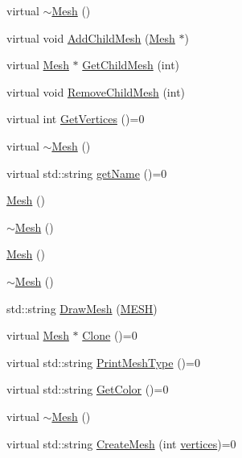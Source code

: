 \begin{DoxyCompactItemize}
virtual \mbox{\hyperlink{class_mesh_ad6a041191ed55c693254e945ce2869ff}{$\sim$\+Mesh}} ()
\item 
virtual void \mbox{\hyperlink{class_mesh_a3f1bcf55b3058829dc7f3dcf260cd231}{Add\+Child\+Mesh}} (\mbox{\hyperlink{class_mesh}{Mesh}} $\ast$)
\item 
virtual \mbox{\hyperlink{class_mesh}{Mesh}} $\ast$ \mbox{\hyperlink{class_mesh_a6a97fe50af0e6b5bca76a15f73bbc1c0}{Get\+Child\+Mesh}} (int)
\item 
virtual void \mbox{\hyperlink{class_mesh_a530e7b4ea82226f6e15b0ff6c36ea3d8}{Remove\+Child\+Mesh}} (int)
\item 
virtual int \mbox{\hyperlink{class_mesh_ad8480168123d9a70563b00cdbe7e73ed}{Get\+Vertices}} ()=0
\item 
virtual \mbox{\hyperlink{class_mesh_ad6a041191ed55c693254e945ce2869ff}{$\sim$\+Mesh}} ()
\item 
virtual std\+::string \mbox{\hyperlink{class_mesh_aa131fe1c2586fe60988155db77c57272}{get\+Name}} ()=0
\item 
\mbox{\hyperlink{class_mesh_a2af137f1571af89172b9c102302c416b}{Mesh}} ()
\item 
\mbox{\hyperlink{class_mesh_a5efe4da1a4c0971cfb037bd70304c303}{$\sim$\+Mesh}} ()
\item 
\mbox{\hyperlink{class_mesh_a2af137f1571af89172b9c102302c416b}{Mesh}} ()
\item 
\mbox{\hyperlink{class_mesh_a5efe4da1a4c0971cfb037bd70304c303}{$\sim$\+Mesh}} ()
\item 
std\+::string \mbox{\hyperlink{class_mesh_a93f132c99c02fa1d48f75c50540acc8d}{Draw\+Mesh}} (\mbox{\hyperlink{_p_i_m_p_l_2_p_i_m_p_l_2_commons_8h_a7d8bc2c54c2771e646f020b8420adafc}{M\+E\+SH}})
\item 
virtual \mbox{\hyperlink{class_mesh}{Mesh}} $\ast$ \mbox{\hyperlink{class_mesh_a11928acab4066671d10e9e531ad96fb6}{Clone}} ()=0
\item 
virtual std\+::string \mbox{\hyperlink{class_mesh_a0d34fc4317a5e3bc2437b610141b9109}{Print\+Mesh\+Type}} ()=0
\item 
virtual std\+::string \mbox{\hyperlink{class_mesh_aa413c0ccbc081aa50a2946e1c6930b0c}{Get\+Color}} ()=0
\item 
virtual \mbox{\hyperlink{class_mesh_ad6a041191ed55c693254e945ce2869ff}{$\sim$\+Mesh}} ()
\item 
virtual std\+::string \mbox{\hyperlink{class_mesh_ae1d22f25fdcadd6dc58793462ffa65a6}{Create\+Mesh}} (int \mbox{\hyperlink{class_mesh_a922390e7245b484961cf4f6e9e37c9dd}{vertices}})=0
\end{DoxyCompactItemize}
